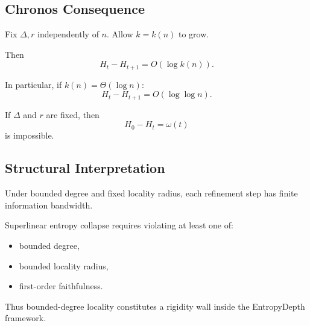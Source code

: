 \subsection{Chronos Consequence}

Fix $\Delta,r$ independently of $n$.
Allow $k = k(n)$ to grow.

Then
\[
H_t - H_{t+1}
=
O(\log k(n)).
\]

In particular, if $k(n)=\Theta(\log n)$:
\[
H_t - H_{t+1}
=
O(\log\log n).
\]

\begin{corollary}
If $\Delta$ and $r$ are fixed,
then
\[
H_0 - H_t = \omega(t)
\]
is impossible.
\end{corollary}

\subsection{Structural Interpretation}

Under bounded degree and fixed locality radius,
each refinement step has finite information bandwidth.

Superlinear entropy collapse requires violating at least one of:
\begin{itemize}
\item bounded degree,
\item bounded locality radius,
\item first-order faithfulness.
\end{itemize}

Thus bounded-degree locality constitutes a rigidity wall
inside the EntropyDepth framework.
